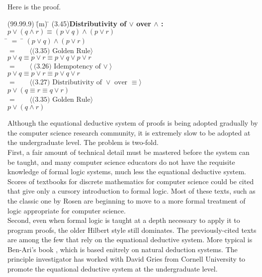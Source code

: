 \documentclass[fleqn, leqno]{article}
\newcommand{\lgap}{2pt}                             %
\newcommand{\mymathindent}{24pt}                      %
\newcommand{\Gll} {\langle}                         %
\newcommand{\Ggg} {\rangle}                         %
\newcommand{\Hint}[1]     {\ \ \ $\Gll              \mbox{#1} \Ggg$ }   %
\begin{document}
Here is the proof.

\begin{tabbing}
(99.99.9)$\;$\=(m)$\;$\=\kill
(3.45)\>\textbf{Distributivity of $\lor$ over $\land$ :}\quad $p\lor (q\land r)\equiv (p\lor q)\land (p\lor r)$\\[\lgap]
\hspace{\mymathindent} \= $= \;$ \=  \kill
  \> \>   $(p\lor q)\land (p\lor r)$\\[\lgap]
  \> $=$  \>  \Hint{(3.35) Golden Rule} \\[\lgap]
  \> \>   $p\lor q\equiv p\lor r\equiv p\lor q\lor p\lor r$\\[\lgap]
  \> $=$  \>  \Hint{(3.26) Idempotency of $\lor$} \\[\lgap]
  \> \>   $p\lor q\equiv p\lor r\equiv p\lor q\lor r$\\[\lgap]
  \> $=$  \>  \Hint{(3.27) Distributivity of $\lor$ over $\equiv$} \\[\lgap]
  \> \>   $p\lor (q\equiv r\equiv q\lor r)$\\[\lgap]
  \> $=$  \>  \Hint{(3.35) Golden Rule} \\[\lgap]
  \> \>   $p\lor (q\land r)$\\[\lgap]
\end{tabbing}


Although the equational deductive system of proofs is being adopted gradually by the computer science research community,
it is extremely slow to be adopted at the undergraduate level. The problem is two-fold.\\

First, a fair amount of technical
detail must be mastered before the system can be taught, and many computer science educators do not have the requisite
knowledge of formal logic systems, much less the equational deductive system.
Scores of textbooks for discrete mathematics for computer science could be cited that give only a cursory introduction to
formal logic. Most of these texts, such as the classic one by Rosen \cite{Rosen} are beginning to move to a more
formal treatment of logic appropriate for computer science.\\

Second, even when formal logic is taught at a depth necessary to apply it to program proofs, the older Hilbert style
still dominates.
The previously-cited texts \cite{Cohen, LADM, Kald} are among the few that rely on the equational deductive system. 
More typical is Ben-Ari's book \cite{Ben}, which is based enitrely on natural deduction systems.
The principle investigator \cite{Warf} has worked with David Gries \cite{Gries} from Cornell University to promote
the equational deductive system at the undergraduate level.\\
\end{document}
